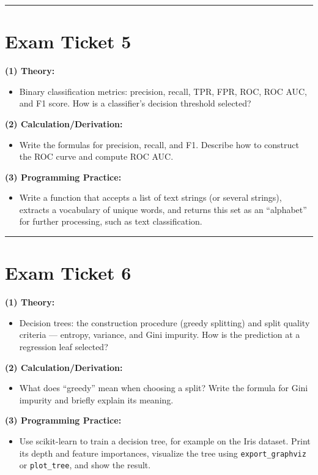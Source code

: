 \documentclass[a4paper,12pt]{article}
\begin{document}
\noindent\rule{\textwidth}{0.4pt}
\newpage

\section*{Exam Ticket 5}
\textbf{(1) Theory:}
\begin{itemize}
  \item Binary classification metrics: precision, recall, TPR, FPR, ROC, ROC AUC, and F1 score. How is a classifier's decision threshold selected?
\end{itemize}

\textbf{(2) Calculation/Derivation:}
\begin{itemize}
  \item Write the formulas for precision, recall, and F1. Describe how to construct the ROC curve and compute ROC AUC.
\end{itemize}

\textbf{(3) Programming Practice:}
\begin{itemize}
  \item Write a function that accepts a list of text strings (or several strings), extracts a vocabulary of unique words, and returns this set as an ``alphabet'' for further processing, such as text classification.
\end{itemize}

\noindent\rule{\textwidth}{0.4pt}
\newpage

\section*{Exam Ticket 6}
\textbf{(1) Theory:}
\begin{itemize}
  \item Decision trees: the construction procedure (greedy splitting) and split quality criteria --- entropy, variance, and Gini impurity. How is the prediction at a regression leaf selected?
\end{itemize}

\textbf{(2) Calculation/Derivation:}
\begin{itemize}
  \item What does ``greedy'' mean when choosing a split? Write the formula for Gini impurity and briefly explain its meaning.
\end{itemize}

\textbf{(3) Programming Practice:}
\begin{itemize}
  \item Use scikit-learn to train a decision tree, for example on the Iris dataset. Print its depth and feature importances, visualize the tree using \texttt{export\_graphviz} or \texttt{plot\_tree}, and show the result.
\end{itemize}
\end{document}
